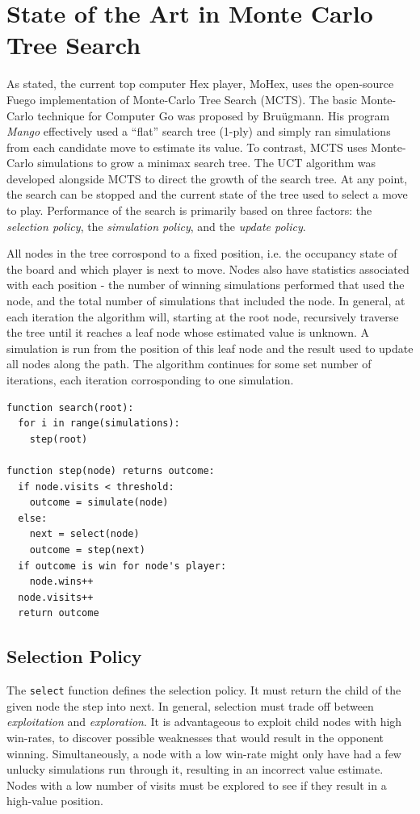 \documentclass[10pt,a4paper]{report}
\begin{document}
\section{State of the Art in Monte Carlo Tree Search}\label{mcts}
As stated, the current top computer Hex player, MoHex, uses the open-source Fuego implementation of Monte-Carlo Tree Search (MCTS). The basic Monte-Carlo technique for Computer Go was proposed by Bru\"{u}gmann\cite{brugmann1993monte}. His program \emph{Mango} effectively used a ``flat'' search tree (1-ply) and simply ran simulations from each candidate move to estimate its value. To contrast, MCTS uses Monte-Carlo simulations to grow a minimax search tree. The UCT algorithm was developed alongside MCTS to direct the growth of the search tree\cite{gelly2006exploration}. At any point, the search can be stopped and the current state of the tree used to select a move to play. Performance of the search is primarily based on three factors: the \emph{selection policy}, the \emph{simulation policy}, and the \emph{update policy}.

All nodes in the tree corrospond to a fixed position, i.e. the occupancy state of the board and which player is next to move. Nodes also have statistics associated with each position - the number of winning simulations performed that used the node, and the total number of simulations that included the node. In general, at each iteration the algorithm will, starting at the root node, recursively traverse the tree until it reaches a leaf node whose estimated value is unknown. A simulation is run from the position of this leaf node and the result used to update all nodes along the path. The algorithm continues for some set number of iterations, each iteration corrosponding to one simulation.

\begin{verbatim}
function search(root):
  for i in range(simulations):
    step(root)
		
function step(node) returns outcome:
  if node.visits < threshold:
    outcome = simulate(node)
  else:
    next = select(node)
    outcome = step(next)
  if outcome is win for node's player:
    node.wins++
  node.visits++
  return outcome
\end{verbatim}

\subsection{Selection Policy}
The \texttt{select} function defines the selection policy. It must return the child of the given node the step into next. In general, selection must trade off between \emph{exploitation} and \emph{exploration}. It is advantageous to exploit child nodes with high win-rates, to discover possible weaknesses that would result in the opponent winning. Simultaneously, a node with a low win-rate might only have had a few unlucky simulations run through it, resulting in an incorrect value estimate. Nodes with a low number of visits must be explored to see if they result in a high-value position.
\end{document}
